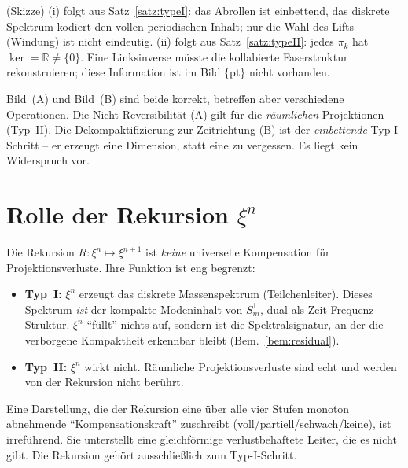 \begin{beweis}
(Skizze) (i) folgt aus Satz~\ref{satz:typeI}: das Abrollen ist einbettend, das
diskrete Spektrum kodiert den vollen periodischen Inhalt; nur die Wahl des Lifts
(Windung) ist nicht eindeutig. (ii) folgt aus Satz~\ref{satz:typeII}: jedes
$\pi_k$ hat $\ker = \mathbb{R}\neq\{0\}$. Eine Linksinverse m\"usste die
kollabierte Faserstruktur rekonstruieren; diese Information ist im Bild
$\{\mathrm{pt}\}$ nicht vorhanden.
\end{beweis}

\begin{corollary}
Bild~(A) und Bild~(B) sind beide korrekt, betreffen aber verschiedene
Operationen. Die Nicht-Reversibilit\"at (A) gilt f\"ur die \emph{r\"aumlichen}
Projektionen (Typ~II). Die Dekompaktifizierung zur Zeitrichtung (B) ist der
\emph{einbettende} Typ-I-Schritt -- er erzeugt eine Dimension, statt eine zu
vergessen. Es liegt kein Widerspruch vor.
\end{corollary}

\section{Rolle der Rekursion $\xi^n$}

Die Rekursion $R:\xi^n \mapsto \xi^{n+1}$ ist \emph{keine} universelle
Kompensation f\"ur Projektionsverluste. Ihre Funktion ist eng begrenzt:
\begin{itemize}
  \item \textbf{Typ~I:} $\xi^n$ erzeugt das diskrete Massenspektrum
  (Teilchenleiter). Dieses Spektrum \emph{ist} der kompakte Modeninhalt von
  $S^1_m$, dual als Zeit-Frequenz-Struktur. $\xi^n$ ``f\"ullt'' nichts auf,
  sondern ist die Spektralsignatur, an der die verborgene Kompaktheit erkennbar
  bleibt (Bem.~\ref{bem:residual}).
  \item \textbf{Typ~II:} $\xi^n$ wirkt nicht. R\"aumliche Projektionsverluste
  sind echt und werden von der Rekursion nicht ber\"uhrt.
\end{itemize}

\begin{remark}
Eine Darstellung, die der Rekursion eine \"uber alle vier Stufen monoton
abnehmende ``Kompensationskraft'' zuschreibt (voll/partiell/schwach/keine), ist
irref\"uhrend. Sie unterstellt eine gleichf\"ormige verlustbehaftete Leiter, die
es nicht gibt. Die Rekursion geh\"ort ausschlie\ss lich zum Typ-I-Schritt.
\end{remark}

